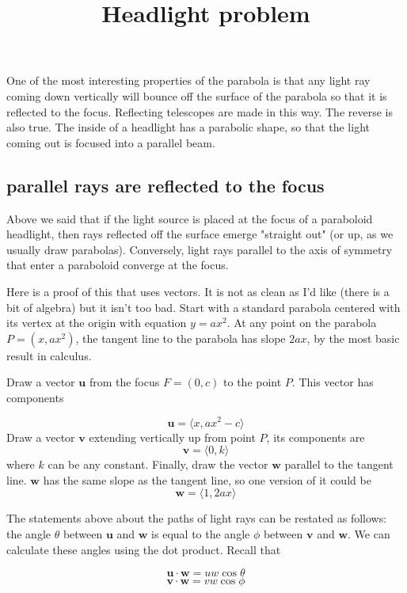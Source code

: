 \documentclass[11pt, oneside]{article}
\title{Headlight problem}
\date{}
\begin{document}
\maketitle
\Large

One of the most interesting properties of the parabola is that any light ray coming down vertically will bounce off the surface of the parabola so that it is reflected to the focus.  Reflecting telescopes are made in this way.  The reverse is also true.  The inside of a headlight has a parabolic shape, so that the light coming out is focused into a parallel beam.

\subsection*{parallel rays are reflected to the focus}
Above we said that if the light source is placed at the focus of a paraboloid headlight, then rays reflected off the surface emerge "straight out" (or up, as we usually draw parabolas).  Conversely, light rays parallel to the axis of symmetry that enter a paraboloid converge at the focus.

Here is a proof of this that uses vectors.  It is not as clean as I'd like (there is a bit of algebra) but it isn't too bad.  Start with a standard parabola centered with its vertex at the origin with equation $y=ax^2$.  At any point on the parabola $P = (x,ax^2)$, the tangent line to the parabola has slope $2ax$, by the most basic result in calculus.

Draw a vector $\mathbf{u}$ from the focus $F = (0,c)$ to the point $P$.  This vector has components

\[ \mathbf{u} = \langle x, ax^2 - c \rangle \]
Draw a vector $\mathbf{v}$ extending vertically up from point $P$, its components are
\[ \mathbf{v} = \langle 0, k \rangle \]
where $k$ can be any constant.
Finally, draw the vector $\mathbf{w}$ parallel to the tangent line.  $\mathbf{w}$ has the same slope as the tangent line, so one version of it could be
\[ \mathbf{w} = \langle 1, 2ax \rangle \]

The statements above about the paths of light rays can be restated as follows:  the angle $\theta$ between $\mathbf{u}$ and $\mathbf{w}$ is equal to the angle $\phi$ between $\mathbf{v}$ and $\mathbf{w}$.  We can calculate these angles using the dot product.  Recall that

\[ \mathbf{u} \cdot \mathbf{w} = u w \cos \theta \]
\[ \mathbf{v} \cdot \mathbf{w} = v w \cos \phi \]
\end{document}

